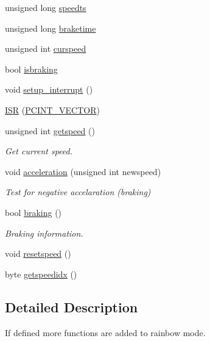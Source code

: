 \begin{DoxyCompactItemize}
\item 
unsigned long \hyperlink{group__speed_ga605bafc427aaa8e9718a112441ba88a7}{speedts}
\item 
unsigned long \hyperlink{group__speed_ga66ce79a1ea6b700d56211c146f679649}{braketime}
\item 
unsigned int \hyperlink{group__speed_ga63232e097931bc02aa65b3b7dadbb74b}{curspeed}
\item 
bool \hyperlink{group__speed_gad13fd9ed7295daa9a51dd2fade080e50}{isbraking}
\item 
void \hyperlink{group__speed_gae87a94769934715c309733cfdf2abcb4}{setup\+\_\+interrupt} ()
\item 
\hyperlink{group__speed_ga44395845abd4a9c31e4fbe88ed717fa3}{I\+SR} (\hyperlink{group__speed_ga77b45027297b1ff40b5b1249afb852e5}{P\+C\+I\+N\+T\+\_\+\+V\+E\+C\+T\+OR})
\item 
unsigned int \hyperlink{group__speed_gafc7b1718f9b23966dfed24056f67996f}{getspeed} ()
\begin{DoxyCompactList}\small\item\em Get current speed. \end{DoxyCompactList}\item 
void \hyperlink{group__speed_gaa41dbc9d264f533090ac3c808c43171f}{acceleration} (unsigned int newspeed)
\begin{DoxyCompactList}\small\item\em Test for negative accelaration (braking) \end{DoxyCompactList}\item 
bool \hyperlink{group__speed_ga3ad56507af5eec4c270def2058efbc3b}{braking} ()
\begin{DoxyCompactList}\small\item\em Braking information. \end{DoxyCompactList}\item 
void \hyperlink{group__speed_ga2004678343c1f7b145dc10aae949a4ec}{resetspeed} ()
\item 
byte \hyperlink{group__speed_gaa1b4f1cc5cf5ba94e3bc38f44e0c7001}{getspeedidx} ()
\end{DoxyCompactItemize}


\subsection{Detailed Description}
If defined more functions are added to rainbow mode. 

